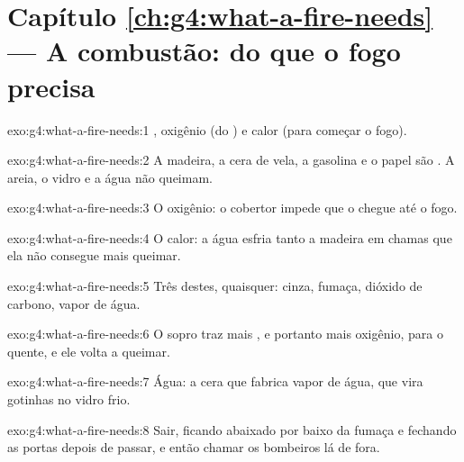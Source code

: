 \section*{Capítulo \ref{ch:g4:what-a-fire-needs} --- A combustão: do que o fogo precisa}

\begin{solution}{exo:g4:what-a-fire-needs:1}
, oxigênio (do ) e calor (para começar o fogo).
\end{solution}

\begin{solution}{exo:g4:what-a-fire-needs:2}
A madeira, a cera de vela, a gasolina e o papel são . A
areia, o vidro e a água não queimam.
\end{solution}

\begin{solution}{exo:g4:what-a-fire-needs:3}
O oxigênio: o cobertor impede que o  chegue até o fogo.
\end{solution}

\begin{solution}{exo:g4:what-a-fire-needs:4}
O calor: a água esfria tanto a madeira em chamas que ela não consegue
mais queimar.
\end{solution}

\begin{solution}{exo:g4:what-a-fire-needs:5}
Três destes, quaisquer: cinza, fumaça, dióxido de carbono, vapor de água.
\end{solution}

\begin{solution}{exo:g4:what-a-fire-needs:6}
O sopro traz mais , e portanto mais oxigênio, para o 
quente, e ele volta a queimar.
\end{solution}

\begin{solution}{exo:g4:what-a-fire-needs:7}
Água: a cera que  fabrica vapor de água, que vira gotinhas no
vidro frio.
\end{solution}

\begin{solution}{exo:g4:what-a-fire-needs:8}
Sair, ficando abaixado por baixo da fumaça e fechando as portas depois
de passar, e então chamar os bombeiros lá de fora.
\end{solution}

